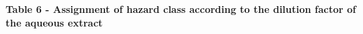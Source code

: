 {\bfseries Table 6 - Assignment of hazard class according to the dilution
factor of the aqueous extract}

